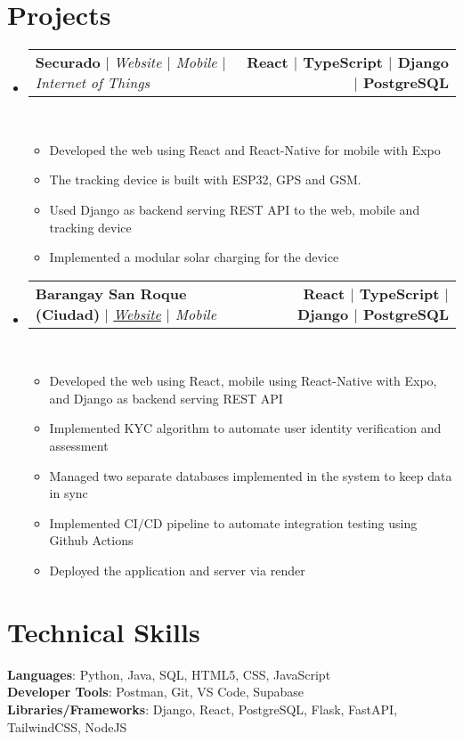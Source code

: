 \documentclass[letterpaper,11pt]{article}
\makeatletter
\newcommand{\resumeItem}[1]{
  \item\small{
    {#1 \vspace{0pt}}
  }
}
\newcommand{\resumeProjectHeading}[2]{
    \item
    \begin{tabular*}{1.001\textwidth}{l@{\extracolsep{\fill}}r}
      \small#1 & \textbf{\small #2}\\
    \end{tabular*}\vspace{-7pt}
}
\newcommand{\resumeSubHeadingListStart}{\begin{itemize}[leftmargin=0.0in, label={}]}
\newcommand{\resumeSubHeadingListEnd}{\end{itemize}}\vspace{0pt}
\newcommand{\resumeItemListStart}{\begin{itemize}}
\newcommand{\resumeItemListEnd}{\end{itemize}\vspace{-5pt}}
\makeatother
\begin{document}
\section{Projects} 
    \vspace{-5pt}
    \resumeSubHeadingListStart
    \resumeProjectHeading
            {\textbf{{Securado}} $|$ \emph{{Website} {$|$} {Mobile} {$|$} {Internet of Things}}}{React $|$ TypeScript $|$ Django $|$ PostgreSQL}
            \\[5mm]
          \resumeItemListStart
            \resumeItem{Developed the web using React and React-Native for mobile with Expo}
            \resumeItem{The tracking device is built with ESP32, GPS and GSM.}
            \resumeItem{Used Django as backend serving REST API to the web, mobile and tracking device}
            \resumeItem{Implemented a modular solar charging for the device}
          \resumeItemListEnd
    \vspace{-20pt}
    \resumeProjectHeading
            {\textbf{{Barangay San Roque (Ciudad)}} $|$ \emph{\href{https://www.sanroqueciudad.com/}{Website} {$|$} {Mobile}}}{React $|$ TypeScript $|$ Django $|$ PostgreSQL}
            \\[5mm]
          \resumeItemListStart
            \resumeItem{Developed the web using React, mobile using React-Native with Expo, and Django as backend serving REST API}
            \resumeItem{Implemented KYC algorithm to automate user identity verification and assessment}
            \resumeItem{Managed two separate databases implemented in the system to keep data in sync} 
            \resumeItem{Implemented CI{$/$}CD pipeline to automate integration testing using Github Actions}
            \resumeItem{Deployed the application and server via render} 
          \resumeItemListEnd
\resumeSubHeadingListEnd
\vspace{-12pt}

\section{Technical Skills}
 \begin{itemize}[leftmargin=0.15in, label={}]
    \small{\item{   
     \textbf{Languages}{: Python, Java, SQL, HTML5, CSS, JavaScript} \\[1mm]
     \textbf{Developer Tools}{: Postman, Git, VS Code, Supabase} \\[1mm]
     \textbf{Libraries/Frameworks}{: Django, React, PostgreSQL, Flask, FastAPI, TailwindCSS, NodeJS} \\ [1mm]
    }}
 \end{itemize}
 \vspace{-16pt}
 \vspace{3pt}
\vspace{10pt}

\vspace{-15pt}
\end{document}
